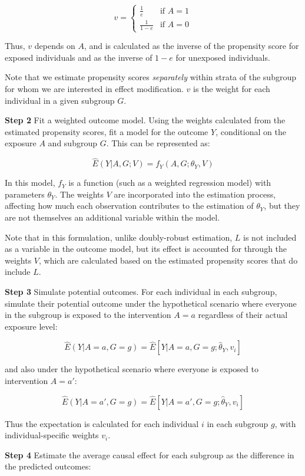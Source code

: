 \documentclass[
  singlecolumn]{article}
\begin{document}
\[
v = 
\begin{cases} 
\frac{1}{e} & \text{if } A = 1 \\
\frac{1}{1-e} & \text{if } A = 0 
\end{cases}
\]

Thus, \(v\) depends on \(A\), and is calculated as the inverse of the
propensity score for exposed individuals and as the inverse of \(1-e\)
for unexposed individuals.

Note that we estimate propensity scores \emph{separately} within strata
of the subgroup for whom we are interested in effect modification. \(v\)
is the weight for each individual in a given subgroup \(G\).

\textbf{Step 2} Fit a weighted outcome model. Using the weights
calculated from the estimated propensity scores, fit a model for the
outcome \(Y\), conditional on the exposure \(A\) and subgroup \(G\).
This can be represented as:

\[ \hat{E}(Y|A, G; V) = f_Y(A, G ; \theta_Y, V) \]

In this model, \(f_Y\) is a function (such as a weighted regression
model) with parameters \(θ_Y\). The weights \(V\) are incorporated into
the estimation process, affecting how much each observation contributes
to the estimation of \(θ_Y\), but they are not themselves an additional
variable within the model.

Note that in this formulation, unlike doubly-robust estimation, \(L\) is
not included as a variable in the outcome model, but its effect is
accounted for through the weights \(V\), which are calculated based on
the estimated propensity scores that do include \(L\).

\textbf{Step 3} Simulate potential outcomes. For each individual in each
subgroup, simulate their potential outcome under the hypothetical
scenario where everyone in the subgroup is exposed to the intervention
\(A=a\) regardless of their actual exposure level:

\[\hat{E}(Y|A=a, G=g)  = \hat{E}[Y|A=a,G=g; \hat{\theta}_Y,  v_i]\]

and also under the hypothetical scenario where everyone is exposed to
intervention \(A=a'\):

\[\hat{E}(Y|A=a', G=g)  = \hat{E}[Y|A=a',G=g; \hat{\theta}_Y,  v_i]\]

Thus the expectation is calculated for each individual \(i\) in each
subgroup \(g\), with individual-specific weights \(v_i\).

\textbf{Step 4} Estimate the average causal effect for each subgroup as
the difference in the predicted outcomes:
\end{document}
